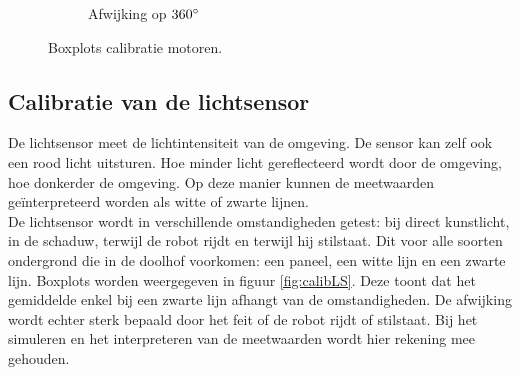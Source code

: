 \documentclass[tt3]{penoverslag}
\begin{document}
\begin{figure}
\begin{subfigure}[h]{0.32\textwidth}
                \caption{Afwijking op $360 \degree$}
        \end{subfigure}
 \caption{Boxplots calibratie motoren.}
\label{fig:calibM}
\end{figure}


\subsection{Calibratie van de lichtsensor} %
\label{ssec:calibLS}
De lichtsensor meet de lichtintensiteit van de omgeving. De sensor kan zelf ook een rood licht uitsturen. Hoe minder licht gereflecteerd wordt door de omgeving, hoe donkerder de omgeving. Op deze manier kunnen de meetwaarden ge\"interpreteerd worden als witte of zwarte lijnen.\\
De lichtsensor wordt in verschillende omstandigheden getest: bij direct kunstlicht, in de schaduw, terwijl de robot rijdt en terwijl hij stilstaat. Dit voor alle soorten ondergrond die in de doolhof voorkomen: een paneel, een witte lijn en een zwarte lijn. Boxplots worden weergegeven in figuur \ref{fig:calibLS}. Deze toont dat het gemiddelde enkel bij een zwarte lijn afhangt van de omstandigheden. De afwijking wordt echter sterk bepaald door het feit of de robot rijdt of stilstaat. Bij het simuleren en het interpreteren van de meetwaarden wordt hier rekening mee gehouden.
\end{document}
